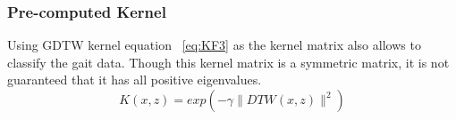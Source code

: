 \documentclass{sig-alternate}
\begin{document}
\subsubsection{Pre-computed Kernel}
Using GDTW kernel equation ~\ref{eq:KF3} as the kernel matrix also allows to classify the gait data. Though this kernel matrix is a symmetric matrix, it is not guaranteed that it has all positive eigenvalues. 
\begin{equation} \label{eq:KF3}
K(x,z)=exp(-\gamma \parallel DTW(x,z) \parallel ^2)
\end{equation}	
\end{document}
